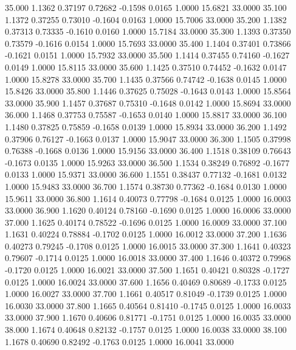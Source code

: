   35.000   1.1362   0.37197   0.72682  -0.1598   0.0165   1.0000  15.6821  33.0000
  35.100   1.1372   0.37255   0.73010  -0.1604   0.0163   1.0000  15.7006  33.0000
  35.200   1.1382   0.37313   0.73335  -0.1610   0.0160   1.0000  15.7184  33.0000
  35.300   1.1393   0.37350   0.73579  -0.1616   0.0154   1.0000  15.7693  33.0000
  35.400   1.1404   0.37401   0.73866  -0.1621   0.0151   1.0000  15.7932  33.0000
  35.500   1.1414   0.37455   0.74160  -0.1627   0.0149   1.0000  15.8115  33.0000
  35.600   1.1425   0.37510   0.74452  -0.1632   0.0147   1.0000  15.8278  33.0000
  35.700   1.1435   0.37566   0.74742  -0.1638   0.0145   1.0000  15.8426  33.0000
  35.800   1.1446   0.37625   0.75028  -0.1643   0.0143   1.0000  15.8564  33.0000
  35.900   1.1457   0.37687   0.75310  -0.1648   0.0142   1.0000  15.8694  33.0000
  36.000   1.1468   0.37753   0.75587  -0.1653   0.0140   1.0000  15.8817  33.0000
  36.100   1.1480   0.37825   0.75859  -0.1658   0.0139   1.0000  15.8934  33.0000
  36.200   1.1492   0.37906   0.76127  -0.1663   0.0137   1.0000  15.9047  33.0000
  36.300   1.1505   0.37998   0.76388  -0.1668   0.0136   1.0000  15.9156  33.0000
  36.400   1.1518   0.38109   0.76643  -0.1673   0.0135   1.0000  15.9263  33.0000
  36.500   1.1534   0.38249   0.76892  -0.1677   0.0133   1.0000  15.9371  33.0000
  36.600   1.1551   0.38437   0.77132  -0.1681   0.0132   1.0000  15.9483  33.0000
  36.700   1.1574   0.38730   0.77362  -0.1684   0.0130   1.0000  15.9611  33.0000
  36.800   1.1614   0.40073   0.77798  -0.1684   0.0125   1.0000  16.0003  33.0000
  36.900   1.1620   0.40124   0.78160  -0.1690   0.0125   1.0000  16.0006  33.0000
  37.000   1.1625   0.40174   0.78522  -0.1696   0.0125   1.0000  16.0009  33.0000
  37.100   1.1631   0.40224   0.78884  -0.1702   0.0125   1.0000  16.0012  33.0000
  37.200   1.1636   0.40273   0.79245  -0.1708   0.0125   1.0000  16.0015  33.0000
  37.300   1.1641   0.40323   0.79607  -0.1714   0.0125   1.0000  16.0018  33.0000
  37.400   1.1646   0.40372   0.79968  -0.1720   0.0125   1.0000  16.0021  33.0000
  37.500   1.1651   0.40421   0.80328  -0.1727   0.0125   1.0000  16.0024  33.0000
  37.600   1.1656   0.40469   0.80689  -0.1733   0.0125   1.0000  16.0027  33.0000
  37.700   1.1661   0.40517   0.81049  -0.1739   0.0125   1.0000  16.0030  33.0000
  37.800   1.1665   0.40564   0.81410  -0.1745   0.0125   1.0000  16.0033  33.0000
  37.900   1.1670   0.40606   0.81771  -0.1751   0.0125   1.0000  16.0035  33.0000
  38.000   1.1674   0.40648   0.82132  -0.1757   0.0125   1.0000  16.0038  33.0000
  38.100   1.1678   0.40690   0.82492  -0.1763   0.0125   1.0000  16.0041  33.0000
